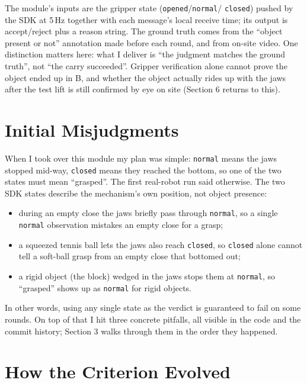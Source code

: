\documentclass[11pt,a4paper]{ctexart}
\begin{document}
The module's inputs are the gripper state (\texttt{opened}/\texttt{normal}/
\texttt{closed}) pushed by the SDK at 5\,Hz together with each message's local
receive time; its output is accept/reject plus a reason string. The ground
truth comes from the ``object present or not'' annotation made before each
round, and from on-site video. One distinction matters here: what I deliver
is ``the judgment matches the ground truth'', not ``the carry succeeded''.
Gripper verification alone cannot prove the object ended up in B, and whether
the object actually rides up with the jaws after the test lift is still
confirmed by eye on site (Section 6 returns to this).

\section{Initial Misjudgments}

When I took over this module my plan was simple: \texttt{normal} means the
jaws stopped mid-way, \texttt{closed} means they reached the bottom, so one
of the two states must mean ``grasped''. The first real-robot run said
otherwise. The two SDK states describe the mechanism's own position, not
object presence:

\begin{itemize}\setlength{\itemsep}{2pt}
\item during an empty close the jaws briefly pass through \texttt{normal}, so
      a single \texttt{normal} observation mistakes an empty close for a
      grasp;
\item a squeezed tennis ball lets the jaws also reach \texttt{closed}, so
      \texttt{closed} alone cannot tell a soft-ball grasp from an empty close
      that bottomed out;
\item a rigid object (the block) wedged in the jaws stops them at
      \texttt{normal}, so ``grasped'' shows up as \texttt{normal} for rigid
      objects.
\end{itemize}

In other words, using any single state as the verdict is guaranteed to fail
on some rounds. On top of that I hit three concrete pitfalls, all visible in
the code and the commit history; Section 3 walks through them in the order
they happened.

\section{How the Criterion Evolved}
\end{document}
